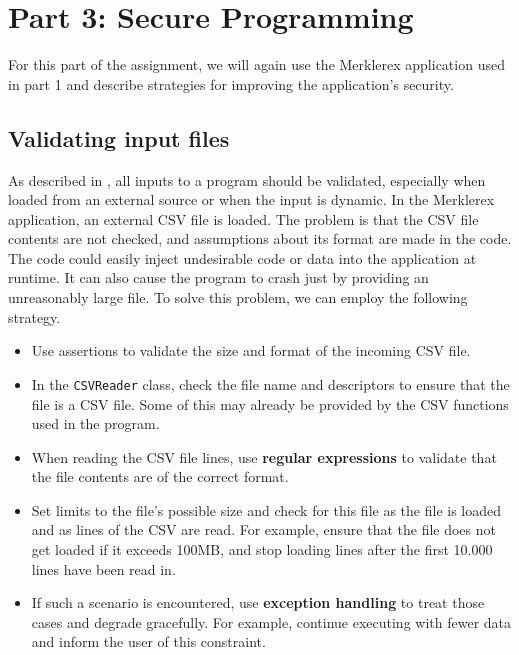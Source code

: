 

\section{Part 3: Secure Programming} %
\label{sec:part_3_secure_programming}

For this part of the assignment, we will again use the Merklerex application used in part 1 and describe strategies for improving the application's security.

\subsection{Validating input files} %
\label{sub:validating_input_files}

As described in \cite{wheeler_2015}, all inputs to a program should be validated, especially when loaded from an external source or when the input is dynamic. In the Merklerex application, an external CSV file is loaded. The problem is that the CSV file contents are not checked, and assumptions about its format are made in the code. The code could easily inject undesirable code or data into the application at runtime. It can also cause the program to crash just by providing an unreasonably large file.
To solve this problem, we can employ the following strategy.
\begin{itemize}
	\item Use assertions to validate the size and format of the incoming CSV file.
	\item In the \texttt{CSVReader} class, check the file name and descriptors to ensure that the file is a CSV file. Some of this may already be provided by the CSV functions used in the program.
	\item When reading the CSV file lines, use \textbf{regular expressions} to validate that the file contents are of the correct format.
	\item Set limits to the file's possible size and check for this file as the file is loaded and as lines of the CSV are read. For example, ensure that the file does not get loaded if it exceeds 100MB, and stop loading lines after the first 10.000 lines have been read in.
	\item If such a scenario is encountered, use \textbf{exception handling} to treat those cases and degrade gracefully. For example, continue executing with fewer data and inform the user of this constraint.
\end{itemize}

